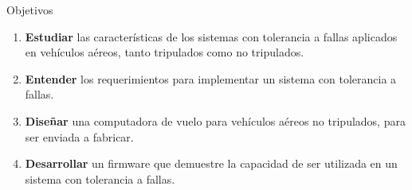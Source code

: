 \begin{frame}{Objetivos}
	\begin{enumerate}
		\item \textbf{Estudiar} las características de los sistemas con tolerancia a fallas aplicados en vehículos aéreos, tanto tripulados como no tripulados.
		\item \textbf{Entender} los requerimientos para implementar un sistema con tolerancia a fallas.
		\item \textbf{Diseñar} una computadora de vuelo para vehículos aéreos no tripulados, para ser enviada a fabricar.
		\item \textbf{Desarrollar} un firmware que demuestre la capacidad de ser utilizada en un sistema con tolerancia a fallas.
	\end{enumerate}
\end{frame}